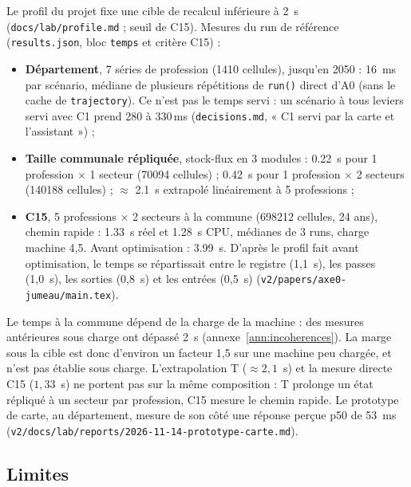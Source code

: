 Le profil du projet fixe une cible de recalcul inférieure à 2~s\suppose{} (\texttt{docs/lab/profile.md} ; seuil
de C15). Mesures du run de référence (\texttt{results.json}, bloc \texttt{temps} et critère C15) :
\begin{itemize}
  \item \textbf{Département}, 7 séries de profession (\num{1410} cellules), jusqu'en 2050 :
        \SI{16}{\milli\second}\mesure{} par scénario, médiane de plusieurs répétitions de \texttt{run()} direct
        d'A0 (sans le cache de \texttt{trajectory}). Ce n'est pas le temps servi : un scénario à tous leviers
        servi avec C1 prend 280 à 330\,ms\mesure{} (\texttt{decisions.md}, « C1 servi par la carte et
        l'assistant ») ;
  \item \textbf{Taille communale répliquée}, stock-flux en 3 modules : \SI{0.22}{\second}\mesure{} pour 1
        profession $\times$ 1 secteur (\num{70094} cellules) ; \SI{0.42}{\second}\mesure{} pour 1 profession
        $\times$ 2 secteurs (\num{140188} cellules) ; $\approx$ \SI{2.1}{\second}\derive{} extrapolé
        linéairement à 5 professions ;
  \item \textbf{C15}, 5 professions $\times$ 2 secteurs à la commune (\num{698212} cellules, 24 ans), chemin
        rapide : \SI{1.33}{\second}\mesure{} réel et \SI{1.28}{\second}\mesure{} CPU, médianes de 3 runs, charge
        machine 4,5\mesure{}. Avant optimisation : \SI{3.99}{\second}\mesure{}. D'après le profil fait avant
        optimisation, le temps se répartissait entre le registre (1,1\mesure{}~s), les passes (1,0\mesure{}~s),
        les sorties (0,8\mesure{}~s) et les entrées (0,5\mesure{}~s) (\texttt{v2/papers/axe0-jumeau/main.tex}).
\end{itemize}
Le temps à la commune dépend de la charge de la machine : des mesures antérieures sous charge ont dépassé
2~s (annexe~\ref{ann:incoherences}). La marge sous la cible est donc d'environ un facteur 1,5\derive{} sur une
machine peu chargée, et n'est pas établie sous charge. L'extrapolation T ($\approx 2{,}1$~s) et la mesure directe
C15 ($1{,}33$~s) ne portent pas sur la même composition : T prolonge un état répliqué à un secteur par
profession, C15 mesure le chemin rapide. Le prototype de carte, au département, mesure de son côté une réponse
perçue p50 de \SI{53}{\milli\second}\mesure{} (\texttt{v2/docs/lab/reports/2026-11-14-prototype-carte.md}).

\subsection{Limites}\label{jum:limites}

